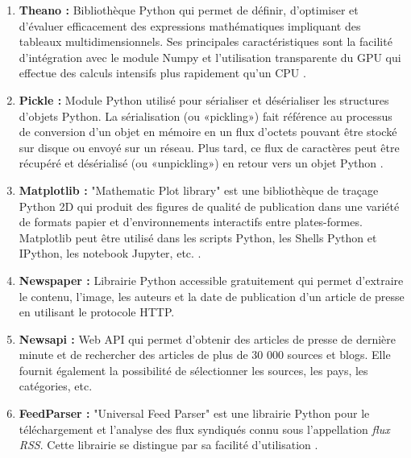 \begin{enumerate}[leftmargin=*]
                \item{\textbf{Theano : }}
                Bibliothèque Python qui permet de définir, d'optimiser et d'évaluer efficacement des expressions mathématiques impliquant des tableaux multidimensionnels. Ses principales caractéristiques sont la facilité d'intégration avec le module Numpy et l'utilisation transparente du GPU qui effectue des calculs intensifs plus rapidement qu'un CPU \cite{theano}.\\

                \item{\textbf{Pickle : }}
                Module Python utilisé pour sérialiser et désérialiser les structures d'objets Python. La sérialisation (ou «pickling») fait référence au processus de conversion d'un objet en mémoire en un flux d'octets pouvant être stocké sur disque ou envoyé sur un réseau. Plus tard, ce flux de caractères peut être récupéré et désérialisé (ou «unpickling») en retour vers un objet Python \cite{pickle}.\\

                \item{\textbf{Matplotlib : }}
                "Mathematic Plot library" est une bibliothèque de traçage Python 2D qui produit des figures de qualité de publication dans une variété de formats papier et d'environnements interactifs entre plates-formes. Matplotlib peut être utilisé dans les scripts Python, les Shells Python et IPython, les notebook Jupyter, etc. \cite{matplotlib}.\\

                \item{\textbf{Newspaper : }}
                Librairie Python accessible gratuitement qui permet d'extraire le contenu, l'image, les auteurs et la date de publication d'un article de presse en utilisant le protocole HTTP.\\

                \item{\textbf{Newsapi : }}
                Web API qui permet d'obtenir des articles de presse de dernière minute et de rechercher des articles de plus de 30 000 sources et blogs. Elle fournit également la possibilité de sélectionner les sources, les pays, les catégories, etc.\\

                \item{\textbf{FeedParser : }}
                "Universal Feed Parser" est une librairie Python pour le téléchargement et l'analyse des flux syndiqués connu sous l'appellation \emph{flux RSS}. Cette librairie se distingue par sa facilité d'utilisation \cite{feedparser}.\\


\end{enumerate}
